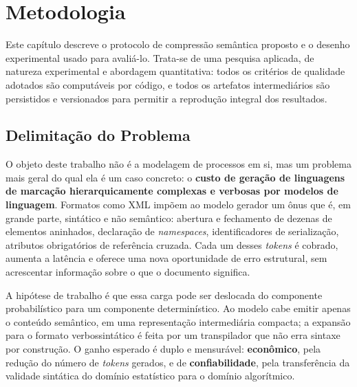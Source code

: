 
\chapter{Metodologia}
\label{chap:metodologia}

Este capítulo descreve o protocolo de compressão semântica proposto e o desenho experimental usado para avaliá-lo. Trata-se de uma pesquisa aplicada, de natureza experimental e abordagem quantitativa: todos os critérios de qualidade adotados são computáveis por código, e todos os artefatos intermediários são persistidos e versionados para permitir a reprodução integral dos resultados.

\section{Delimitação do Problema}
\label{sec:delimitacao}

O objeto deste trabalho não é a modelagem de processos em si, mas um problema mais geral do qual ela é um caso concreto: o \textbf{custo de geração de linguagens de marcação hierarquicamente complexas e verbosas por modelos de linguagem}. Formatos como XML impõem ao modelo gerador um ônus que é, em grande parte, sintático e não semântico: abertura e fechamento de dezenas de elementos aninhados, declaração de \textit{namespaces}, identificadores de serialização, atributos obrigatórios de referência cruzada. Cada um desses \textit{tokens} é cobrado, aumenta a latência e oferece uma nova oportunidade de erro estrutural, sem acrescentar informação sobre o que o documento significa.

A hipótese de trabalho é que essa carga pode ser deslocada do componente probabilístico para um componente determinístico. Ao modelo cabe emitir apenas o conteúdo semântico, em uma representação intermediária compacta; a expansão para o formato verbossintático é feita por um transpilador que não erra sintaxe por construção. O ganho esperado é duplo e mensurável: \textbf{econômico}, pela redução do número de \textit{tokens} gerados, e de \textbf{confiabilidade}, pela transferência da validade sintática do domínio estatístico para o domínio algorítmico.

